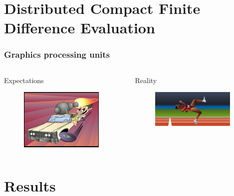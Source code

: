 \documentclass[8pt]{beamer}
\begin{document}
\section{Distributed Compact Finite Difference Evaluation}
\begin{frame}
\frametitle{Graphics processing units}
\begin{columns}[c]
     \begin{column}[T]{5cm}
        Expectations
        \begin{figure}
        \includegraphics[width=150px]{img/expectations.jpg}
        \end{figure}
    \end{column}

    \begin{column}[T]{5cm}
        Reality
        \begin{figure}
        \includegraphics[width=150px]{img/reality.png}
        \end{figure}
    \end{column}
\end{columns}
\end{frame}

\section{Results}
\end{document}
